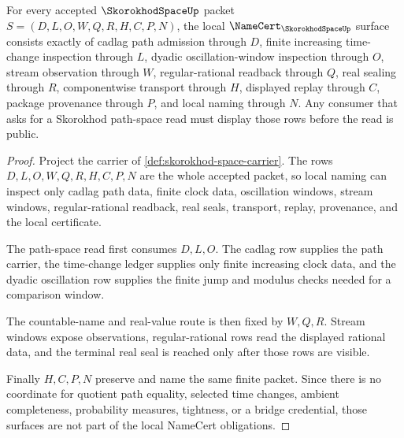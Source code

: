 \begin{theorem}
\label{thm:skorokhod-space-namecert-obligations}
For every accepted $\SkorokhodSpaceUp$ packet $S=(D,L,O,W,Q,R,H,C,P,N)$, the local $\NameCert_{\SkorokhodSpaceUp}$ surface consists exactly of cadlag path admission through $D$, finite increasing time-change inspection through $L$, dyadic oscillation-window inspection through $O$, stream observation through $W$, regular-rational readback through $Q$, real sealing through $R$, componentwise transport through $H$, displayed replay through $C$, package provenance through $P$, and local naming through $N$. Any consumer that asks for a Skorokhod path-space read must display those rows before the read is public.
\end{theorem}
\begin{proof}
Project the carrier of \autoref{def:skorokhod-space-carrier}. The rows $D,L,O,W,Q,R,H,C,P,N$ are the whole accepted packet, so local naming can inspect only cadlag path data, finite clock data, oscillation windows, stream windows, regular-rational readback, real seals, transport, replay, provenance, and the local certificate.

The path-space read first consumes $D,L,O$. The cadlag row supplies the path carrier, the time-change ledger supplies only finite increasing clock data, and the dyadic oscillation row supplies the finite jump and modulus checks needed for a comparison window.

The countable-name and real-value route is then fixed by $W,Q,R$. Stream windows expose observations, regular-rational rows read the displayed rational data, and the terminal real seal is reached only after those rows are visible.

Finally $H,C,P,N$ preserve and name the same finite packet. Since there is no coordinate for quotient path equality, selected time changes, ambient completeness, probability measures, tightness, or a bridge credential, those surfaces are not part of the local NameCert obligations.
\end{proof}

